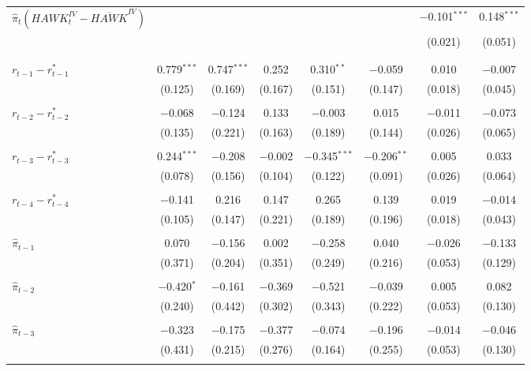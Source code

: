 \documentclass[12pt]{article}
\numberwithin{equation}{section}
\begin{document}
\begin{table}[!htbp]
\begin{threeparttable}
\begin{tabular}{@{\extracolsep{2pt}}lccccccc}
    $\hat\pi_t \left(\mathit{HAWK}_{t}^\mathit{IV}-\overline{\mathit{HAWK}}^\mathit{IV}\right)$ &  &  &  &  &  & $-$0.101$^{***}$ & 0.148$^{***}$ \\ 
    &  &  &  &  &  & (0.021) & (0.051) \\ 
    & & & & & & \\ 
    & & & & & & \\ 
   $r_{t-1}-r_{t-1}^*$ & 0.779$^{***}$ & 0.747$^{***}$ & 0.252 & 0.310$^{**}$ & $-$0.059 & 0.010 & $-$0.007 \\ 
   & (0.125) & (0.169) & (0.167) & (0.151) & (0.147) & (0.018) & (0.045) \\ 
    & & & & & & \\ 
    $r_{t-2}-r_{t-2}^*$ & $-$0.068 & $-$0.124 & 0.133 & $-$0.003 & 0.015 & $-$0.011 & $-$0.073 \\ 
    & (0.135) & (0.221) & (0.163) & (0.189) & (0.144) & (0.026) & (0.065) \\ 
    & & & & & & \\ 
    $r_{t-3}-r_{t-3}^*$ & 0.244$^{***}$ & $-$0.208 & $-$0.002 & $-$0.345$^{***}$ & $-$0.206$^{**}$ & 0.005 & 0.033 \\ 
    & (0.078) & (0.156) & (0.104) & (0.122) & (0.091) & (0.026) & (0.064) \\ 
    & & & & & & & \\ 
    $r_{t-4}-r_{t-4}^*$ &  $-$0.141 & 0.216 & 0.147 & 0.265 & 0.139 & 0.019 & $-$0.014 \\ 
    & (0.105) & (0.147) & (0.221) & (0.189) & (0.196) & (0.018) & (0.043) \\ 
    & & & & & & \\ 
  $\hat\pi_{t-1}$ & 0.070 & $-$0.156 & 0.002 & $-$0.258 & 0.040 & $-$0.026 & $-$0.133 \\ 
  & (0.371) & (0.204) & (0.351) & (0.249) & (0.216) & (0.053) & (0.129) \\ 
    & & & & & & \\ 
    $\hat\pi_{t-2}$ & $-$0.420$^{*}$ & $-$0.161 & $-$0.369 & $-$0.521 & $-$0.039 & 0.005 & 0.082 \\ 
    & (0.240) & (0.442) & (0.302) & (0.343) & (0.222) & (0.053) & (0.130) \\ 
    & & & & & & \\ 
    $\hat\pi_{t-3}$  & $-$0.323 & $-$0.175 & $-$0.377 & $-$0.074 & $-$0.196 & $-$0.014 & $-$0.046 \\ 
    & (0.431) & (0.215) & (0.276) & (0.164) & (0.255) & (0.053) & (0.130) \\ 
    & & & & & & \\ 

\end{tabular}
\end{threeparttable}
\end{table}
\end{document}
